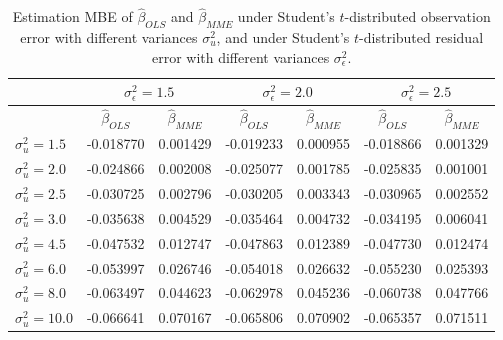 \documentclass{article}
\begin{document}
\begin{table}[ht]
    \centering
    \caption{Estimation MBE of $\hat{\beta}_{OLS}$ and $\hat{\beta}_{MME}$ under Student's $t$-distributed observation error with different variances $\sigma^2_u$, and under Student's $t$-distributed residual error with different variances $\sigma^2_\epsilon$.}
    \label{Tab:MBE_t}
    \begin{tabular}[t]{lcccccc}
        \hline
        &\multicolumn{2}{c}{$\sigma^2_\epsilon=1.5$}&\multicolumn{2}{c}{$\sigma^2_\epsilon=2.0$}&\multicolumn{2}{c}{$\sigma^2_\epsilon=2.5$}\\
        \hline
        &$\hat{\beta}_{OLS}$&$\hat{\beta}_{MME}$&$\hat{\beta}_{OLS}$&$\hat{\beta}_{MME}$&$\hat{\beta}_{OLS}$&$\hat{\beta}_{MME}$\\
        \hline
        $\sigma^2_u = 1.5$&-0.018770&0.001429&-0.019233&0.000955&-0.018866&0.001329\\
        $\sigma^2_u = 2.0$&-0.024866&0.002008&-0.025077&0.001785&-0.025835&0.001001\\
        $\sigma^2_u = 2.5$&-0.030725&0.002796&-0.030205&0.003343&-0.030965&0.002552\\
        $\sigma^2_u = 3.0$&-0.035638&0.004529&-0.035464&0.004732&-0.034195&0.006041\\
        $\sigma^2_u = 4.5$&-0.047532&0.012747&-0.047863&0.012389&-0.047730&0.012474\\
        $\sigma^2_u = 6.0$&-0.053997&0.026746&-0.054018&0.026632&-0.055230&0.025393\\
        $\sigma^2_u = 8.0$&-0.063497&0.044623&-0.062978&0.045236&-0.060738&0.047766\\
        $\sigma^2_u = 10.0$&-0.066641&0.070167&-0.065806&0.070902&-0.065357&0.071511\\
    \end{tabular}
\end{table}
\end{document}
